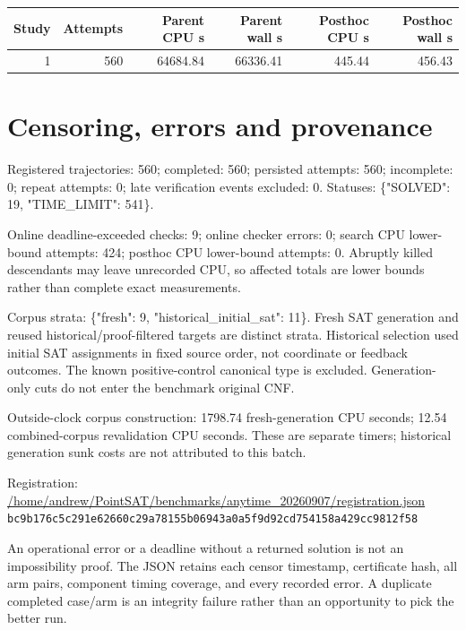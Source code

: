 \documentclass[10pt,a4paper]{article}
\begin{document}
\begin{center}\small\begin{longtable}{rrrrrr}
\toprule
Study & Attempts & Parent CPU s & Parent wall s & Posthoc CPU s & Posthoc wall s \\
\midrule\endhead
1 & 560 & 64684.84 & 66336.41 & 445.44 & 456.43 \\
\bottomrule\end{longtable}\end{center}


\section*{Censoring, errors and provenance}

Registered trajectories: 560; completed: 560; persisted attempts: 560; incomplete: 0; repeat attempts: 0; late verification events excluded: 0. Statuses: \{"SOLVED": 19, "TIME\_LIMIT": 541\}.

Online deadline-exceeded checks: 9; online checker errors: 0; search CPU lower-bound attempts: 424; posthoc CPU lower-bound attempts: 0. Abruptly killed descendants may leave unrecorded CPU, so affected totals are lower bounds rather than complete exact measurements.

Corpus strata: \{"fresh": 9, "historical\_initial\_sat": 11\}. Fresh SAT generation and reused historical/proof-filtered targets are distinct strata. Historical selection used initial SAT assignments in fixed source order, not coordinate or feedback outcomes. The known positive-control canonical type is excluded. Generation-only cuts do not enter the benchmark original CNF.

Outside-clock corpus construction: 1798.74 fresh-generation CPU seconds; 12.54 combined-corpus revalidation CPU seconds. These are separate timers; historical generation sunk costs are not attributed to this batch.

{\small Registration: \url{/home/andrew/PointSAT/benchmarks/anytime_20260907/registration.json}}\\{\footnotesize\texttt{bc9b176c5c291e62660c29a78155b06943a0a5f9d92cd754158a429cc9812f58}}

An operational error or a deadline without a returned solution is not an impossibility proof. The JSON retains each censor timestamp, certificate hash, all arm pairs, component timing coverage, and every recorded error. A duplicate completed case/arm is an integrity failure rather than an opportunity to pick the better run.
\end{document}
